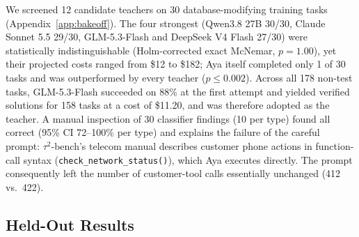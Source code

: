 \documentclass[11pt]{article}
\begin{document}
We screened 12 candidate teachers on 30 database-modifying training tasks (Appendix~\ref{app:bakeoff}). The four strongest (Qwen3.8 27B 30/30, Claude Sonnet 5.5 29/30, GLM-5.3-Flash and DeepSeek V4 Flash 27/30) were statistically indistinguishable (Holm-corrected exact McNemar, $p = 1.00$), yet their projected costs ranged from \$12 to \$182; Aya itself completed only 1 of 30 tasks and was outperformed by every teacher ($p \le 0.002$). Across all 178 non-test tasks, GLM-5.3-Flash succeeded on 88\% at the first attempt and yielded verified solutions for 158 tasks at a cost of \$11.20, and was therefore adopted as the teacher. A manual inspection of 30 classifier findings (10 per type) found all correct (95\% CI 72--100\% per type) and explains the failure of the careful prompt: $\tau^2$-bench's telecom manual describes customer phone actions in function-call syntax (\texttt{check\_network\_status()}), which Aya executes directly. The prompt consequently left the number of customer-tool calls essentially unchanged (412 vs.\ 422).

\subsection{Held-Out Results}
\label{sec:exp_test}

\begin{table}[t]
\centering
\footnotesize
\setlength{\tabcolsep}{4pt}
\caption{Held-out $\tau^2$-bench test results (100 tasks $\times$ 2 samples = 200 conversations/arm; all 600 oracle-verified by AuditKIT with 0 disagreements; 95\% task-level bootstraps). $^\dagger$Arm B runs self-hosted on vLLM/H100 (32K context; 2/200 overflows scored as failures) while A and C run on Cohere's API (128K), so latency reflects serving differences.}
\label{tab:main_test}
\end{table}
\end{document}
